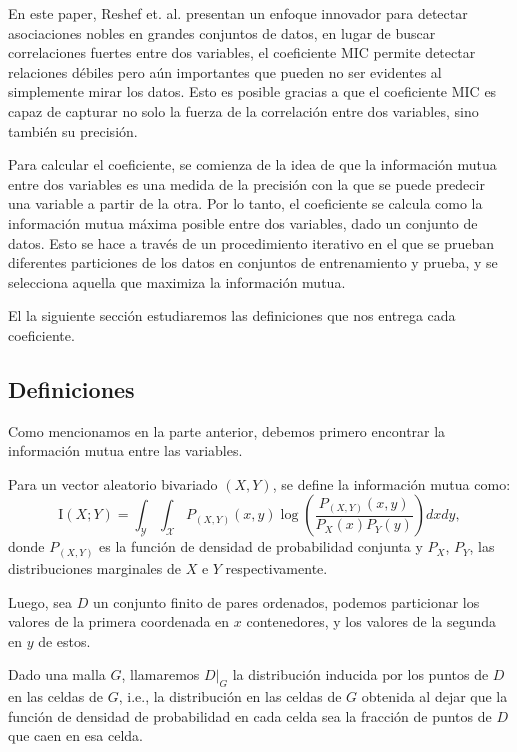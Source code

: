         En este paper, Reshef et. al. presentan un enfoque innovador para detectar asociaciones nobles en grandes conjuntos de datos, en lugar de buscar correlaciones fuertes entre dos variables, el coeficiente MIC permite detectar relaciones d\'ebiles pero a\'un importantes que pueden no ser evidentes al simplemente mirar los datos. Esto es posible gracias a que el coeficiente MIC es capaz de capturar no solo la fuerza de la correlaci\'on entre dos variables, sino tambi\'en su precisi\'on.
    
        Para calcular el coeficiente, se comienza de la idea de que la informaci\'on mutua entre dos variables es una medida de la precisi\'on con la que se puede predecir una variable a partir de la otra. Por lo tanto, el coeficiente se calcula como la informaci\'on mutua m\'axima posible entre dos variables, dado un conjunto de datos. Esto se hace a trav\'es de un procedimiento iterativo en el que se prueban diferentes particiones de los datos en conjuntos de entrenamiento y prueba, y se selecciona aquella que maximiza la informaci\'on mutua.
    
        El la siguiente secci\'on estudiaremos las definiciones que nos entrega cada coeficiente.
     
    \subsection{Definiciones}
    
        Como mencionamos en la parte anterior, debemos primero encontrar la informaci\'on mutua entre las variables.
    
        \begin{defn}
            Para un vector aleatorio bivariado $(X,Y)$, se define la informaci\'on mutua como:
            $$
            \mathrm{I}(X ; Y)=\int_{\mathcal{Y}} \int_{\mathcal{X}} P_{(X, Y)}(x, y) \log \left(\frac{P_{(X, Y)}(x, y)}{P_{X}(x) P_{Y}(y)}\right)dxdy,
            $$
            donde $P_{(X, Y)}$ es la funci\'on de densidad de probabilidad conjunta y $P_{X}$, $P_{Y}$, las distribuciones marginales de $X$ e $Y$ respectivamente. 
        \end{defn}
    
        Luego, sea $D$ un conjunto finito de pares ordenados, podemos particionar los valores de la primera coordenada en $x$ contenedores, y los valores de la segunda en $y$ de estos. 
        
        \begin{defn}
            Dado una malla $G$, llamaremos $D|_G$ la distribuci\'on inducida por los puntos de $D$ en las celdas de $G$, i.e., la distribuci\'on en las celdas de $G$ obtenida al dejar que la funci\'on de densidad de probabilidad en cada celda sea la fracci\'on de puntos de $D$ que caen en esa celda.
        \end{defn}

